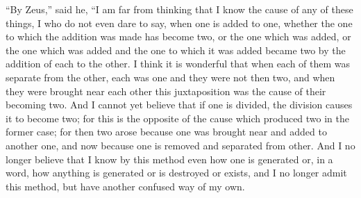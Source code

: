 \documentclass[letterpaper,12pt]{article}
\newcommand{\stephpag}[1]{\marginnote{\small\itshape\fontfamily{ppl}\selectfont #1}}
\begin{document}
\begin{drama}
``By Zeus,'' said he, ``I am far from thinking that I know the cause of any of these things, I who do not even dare to say, when one is added to one, whether the one to which the addition was made has become two, or the one which was added, or the one which was added and \stephpag{97 a} the one to which it was added became two by the addition of each to the other. I think it is wonderful that when each of them was separate from the other, each was one and they were not then two, and when they were brought near each other this juxtaposition was the cause of their becoming two. And I cannot yet believe that if one is divided, the division causes it to become two; for this is the opposite of \stephpag{b} the cause which produced two in the former case; for then two arose because one was brought near and added to another one, and now because one is removed and separated from other. And I no longer believe that I know by this method even how one is generated or, in a word, how anything is generated or is destroyed or exists, and I no longer admit this method, but have another confused way of my own.
 

\end{drama}
\end{document}
